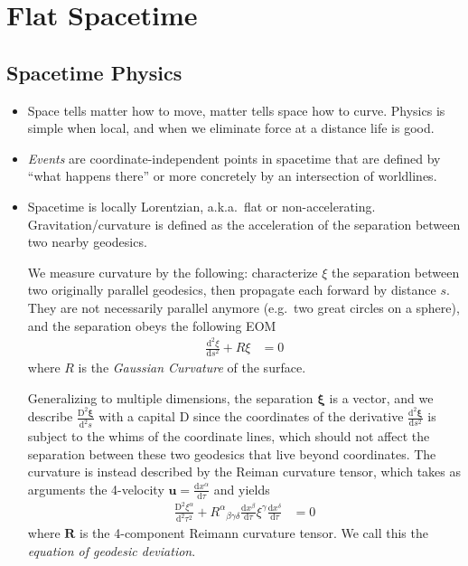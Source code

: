 \documentclass[12pt]{report}
\newcommand{\rd}[2]{\frac{\mathrm{d}#1}{\mathrm{d}#2}}
\newcommand{\rtd}[2]{\frac{\mathrm{d}^2#1}{\mathrm{d}#2^2}}
\begin{document}
\onehalfspacing

\pagestyle{fancy}
\cfoot{\thepage/\pageref{LastPage}}

\tableofcontents

\chapter{Flat Spacetime}

\section{Spacetime Physics}

\begin{itemize}
    \item Space tells matter how to move, matter tells space how to curve.
        Physics is simple when local, and when we eliminate force at a distance
        life is good.

    \item \emph{Events} are coordinate-independent points in spacetime that are
        defined by ``what happens there'' or more concretely by an intersection
        of worldlines.

    \item Spacetime is locally Lorentzian, a.k.a.\ flat or non-accelerating.
        Gravitation/curvature is defined as the acceleration of the separation
        between two nearby geodesics.

        We measure curvature by the following: characterize $\xi$ the separation
        between two originally parallel geodesics, then propagate each forward
        by distance $s$. They are not necessarily parallel anymore (e.g.\ two
        great circles on a sphere), and the separation obeys the following EOM
        \begin{align}
            \rtd{\xi}{s} + R\xi &= 0
        \end{align}
        where $R$ is the \emph{Gaussian Curvature} of the surface.

        Generalizing to multiple dimensions, the separation $\mathbf{\xi}$ is a
        vector, and we describe $\frac{\mathrm{D}^2\mathbf{\xi}}{\mathrm{d}^2s}$
        with a capital $\mathrm{D}$ since the coordinates of the derivative
        $\rtd{\mathbf{\xi}}{s}$ is subject to the whims of the coordinate lines,
        which should not affect the separation between these two geodesics that
        live beyond coordinates. The curvature is instead described by the
        Reiman curvature tensor, which takes as arguments the 4-velocity
        $\mathbf{u} = \rd{x^\alpha}{\tau}$ and yields
        \begin{align}
            \frac{\mathrm{D}^2\xi^\alpha}{\mathrm{d}^2\tau^2} +
                {R^{\alpha}}_{\beta\gamma\delta}
                \rd{x^\beta}{\tau}\xi^\gamma \rd{x^\delta}{\tau} &= 0
        \end{align}
        where $\mathbf{R}$ is the 4-component Reimann curvature tensor. We call
        this the \emph{equation of geodesic deviation}.


\end{itemize}
\end{document}
